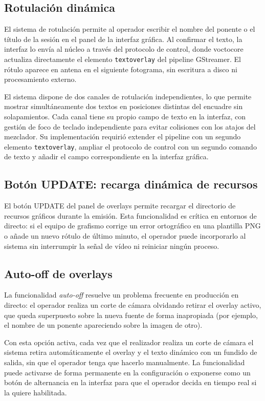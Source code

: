\subsection{Rotulación dinámica}
\label{sec:doble_rotulacion}

El sistema de rotulación permite al operador escribir el nombre del ponente o el título
de la sesión en el panel de la interfaz gráfica. Al confirmar el texto, la interfaz lo
envía al núcleo a través del protocolo de control, donde voctocore actualiza
directamente el elemento \texttt{textoverlay} del pipeline GStreamer. El rótulo aparece
en antena en el siguiente fotograma, sin escritura a disco ni procesamiento externo.

El sistema dispone de dos canales de rotulación independientes, lo que permite mostrar
simultáneamente dos textos en posiciones distintas del encuadre sin solapamientos. Cada
canal tiene su propio campo de texto en la interfaz, con gestión de foco de teclado
independiente para evitar colisiones con los atajos del mezclador. Su implementación
requirió extender el pipeline con un segundo elemento \texttt{textoverlay}, ampliar el
protocolo de control con un segundo comando de texto y añadir el campo correspondiente
en la interfaz gráfica.

\subsection{Botón UPDATE: recarga dinámica de recursos}

El botón UPDATE del panel de overlays permite recargar el directorio de
recursos gráficos durante la emisión. Esta funcionalidad es crítica en entornos de
directo: si el equipo de grafismo corrige un error ortográfico en una plantilla PNG o
añade un nuevo rótulo de último minuto, el operador puede incorporarlo al sistema sin
interrumpir la señal de vídeo ni reiniciar ningún proceso.

\subsection{Auto-off de overlays}

La funcionalidad \textit{auto-off} resuelve un problema frecuente en producción en
directo: el operador realiza un corte de cámara olvidando retirar el overlay activo,
que queda superpuesto sobre la nueva fuente de forma inapropiada (por ejemplo, el
nombre de un ponente apareciendo sobre la imagen de otro).

Con esta opción activa, cada vez que el realizador realiza un corte de cámara el
sistema retira automáticamente el overlay y el texto dinámico con un fundido de salida,
sin que el operador tenga que hacerlo manualmente. La funcionalidad puede activarse de
forma permanente en la configuración o exponerse como un botón de alternancia en la
interfaz para que el operador decida en tiempo real si la quiere habilitada.

